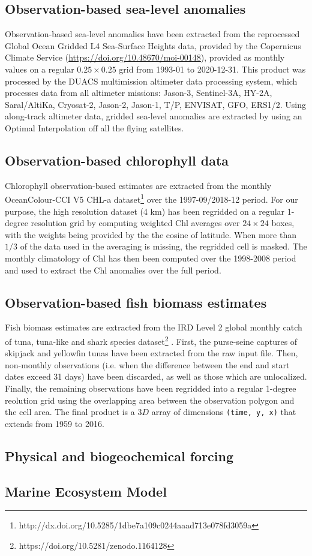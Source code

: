 \subsection{Observation-based sea-level anomalies}
\label{sec:ssh}

Observation-based sea-level anomalies have been extracted from the reprocessed Global Ocean Gridded L4 Sea-Surface Heights data, provided by the Copernicus Climate Service (\url{https://doi.org/10.48670/moi-00148}), provided as monthly values on a regular $0.25 \times 0.25$ grid from 1993-01 to 2020-12-31. This product was processed by the DUACS multimission altimeter data processing system, which processes data from all altimeter missions: Jason-3, Sentinel-3A, HY-2A, Saral/AltiKa, Cryosat-2, Jason-2, Jason-1, T/P, ENVISAT, GFO, ERS1/2. Using along-track altimeter data, gridded sea-level anomalies are extracted by using an Optimal Interpolation off all the flying satellites.

\subsection{Observation-based chlorophyll data}
\label{sec:chl}

Chlorophyll observation-based estimates are extracted from the monthly OceanColour-CCI V5 CHL-a dataset\footnote{http://dx.doi.org/10.5285/1dbe7a109c0244aaad713e078fd3059a}  \citep{sathyendranathOceanColourTimeSeries2019} over the 1997-09/2018-12 period. For our purpose, the high resolution dataset (4 km) has been regridded on a regular 1-degree resolution grid by computing weighted Chl averages over $24\times24$ boxes, with the weights being provided by the the cosine of latitude. When more than $1/3$ of the data used in the averaging is missing, the regridded cell is masked. The monthly climatology of Chl has then been computed over the 1998-2008 period and used to extract the Chl anomalies over the full period.

\subsection{Observation-based fish biomass estimates}
\label{sec:fish}

Fish biomass estimates are extracted from the IRD Level 2 global monthly catch of tuna, tuna-like and shark species dataset\footnote{https://doi.org/10.5281/zenodo.1164128} \citep{taconetGlobalMonthlyCatch2018}. First, the purse-seine captures of skipjack and yellowfin tunas have been extracted from the raw input file. Then, non-monthly observations (i.e. when the difference between the end and start dates exceed 31 days) have been discarded, as well as those which are unlocalized. Finally, the remaining observations have been regridded into a regular 1-degree reolution grid using the overlapping area between the observation polygon and the cell area. The final product is a $3D$ array of dimensions \verb+(time, y, x)+ that extends from 1959 to 2016.

\subsection{Physical and biogeochemical forcing}


\subsection{Marine Ecosystem Model}
